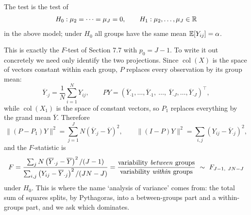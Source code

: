 \documentclass[a4paper]{scrartcl}
\newcommand{\col}{\operatorname{col}}
\begin{document}
\begin{definition}
  The  test is the test of
  $$
  H_0 : \mu_2 = \cdots = \mu_J = 0, \qquad H_1 : \mu_2,\dots,\mu_J \in \mathbb{R}
  $$
  in the above model; under $H_0$ all groups have the same mean $\mathbb{E}[Y_{ij}] = \alpha$.
\end{definition}

This is exactly the $F$-test of Section 7.7 with $p_0 = J-1$. To write it out concretely we need only identify the two projections. Since $\col(X)$ is the space of vectors constant within each group, $P$ replaces every observation by its group mean:
$$
\overline{Y}_{\cdot j} = \frac1N\sum_{i=1}^{N}Y_{ij}, \qquad PY = \left(\overline{Y}_{\cdot 1},\dots,\overline{Y}_{\cdot 1},\ \dots,\ \overline{Y}_{\cdot J},\dots,\overline{Y}_{\cdot J}\right)^\top,
$$
while $\col(X_1)$ is the space of constant vectors, so $P_1$ replaces everything by the grand mean $\overline{Y}$. Therefore
$$
\|(P-P_1)Y\|^2 = \sum_{j=1}^{J}N\left(\overline{Y}_{\cdot j}-\overline{Y}\right)^2, \qquad \|(I-P)Y\|^2 = \sum_{i,j}\left(Y_{ij}-\overline{Y}_{\cdot j}\right)^2,
$$
and the $F$-statistic is
$$
F = \frac{\sum_{j}N\left(\overline{Y}_{\cdot j}-\overline{Y}\right)^2/(J-1)}{\sum_{i,j}\left(Y_{ij}-\overline{Y}_{\cdot j}\right)^2/(JN-J)} = \frac{\text{variability \emph{between} groups}}{\text{variability \emph{within} groups}}\ \sim\ F_{J-1,\ JN-J}
$$
under $H_0$. This is where the name `analysis of variance' comes from: the total sum of squares splits, by Pythagoras, into a between-groups part and a within-groups part, and we ask which dominates.
\end{document}
